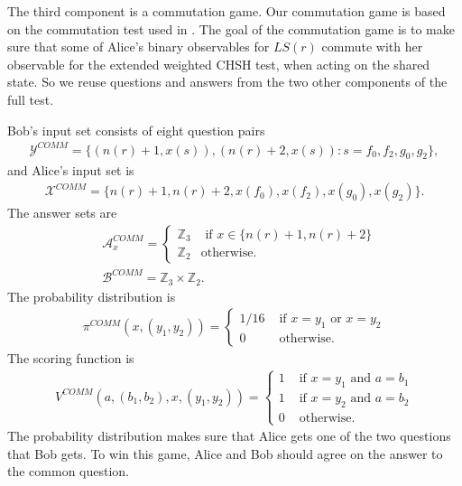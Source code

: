 \documentclass[11pt,letterpaper]{article}
\newcommand{\Z}{\mathbb{Z}}
\newcommand{\calX}{\mathcal{X}}
\newcommand{\calY}{\mathcal{Y}}
\newcommand{\calA}{\mathcal{A}}
\newcommand{\calB}{\mathcal{B}}
\newcommand{\1}{\mathbb{1}}
\newcommand{\LS}{LS}
\newcommand{\COMM}{COMM}
\newcommand{\nr}{n(r)}
\theoremstyle{definition}
\begin{document}
The third component is a commutation game.
Our commutation game is based on the commutation test used in \cite{coladan2017verifier}.
The goal of the commutation game is to make sure that some
of Alice's binary observables for $\LS(r)$ 
commute with her observable for the extended weighted CHSH test,
when acting on the shared state.
So we reuse questions and answers from the two other components
of the full test.

Bob's input set consists of eight question pairs
\begin{align*}
    \calY^{\COMM} = \{(\nr+1, x(s)), (\nr+2, x(s)): s = f_0, f_2, g_0, g_2 \},
\end{align*}
and
Alice's input set is 
\begin{align*}
    \calX^{\COMM} = \{\nr+1, \nr+2, x(f_0), x(f_2), x(g_0), x(g_2)\}.
\end{align*}
The answer sets are 
\begin{align*}
    &\calA^{\COMM}_x = 
    \begin{cases}
    \Z_3 &\text{ if } x \in \{\nr+1, \nr+2\} \\
    \Z_2 &\text{otherwise.}
    \end{cases}
    \\
    &\calB^{\COMM} = \Z_3 \times \Z_2.
\end{align*}
The probability distribution is
\begin{align*}
    \pi^{\COMM}(x,(y_1,y_2)) =
    \begin{cases}
        1/16 &\text{ if } x = y_1 \text{ or } x = y_2 \\
        0   &\text{ otherwise}.
    \end{cases}
\end{align*}
The scoring function is
\begin{align*}
    V^{\COMM}(a, (b_1,b_2), x, (y_1,y_2)) = 
    \begin{cases}
    1 &\text{ if } x = y_1 \text{ and } a = b_1 \\
    1 &\text{ if } x = y_2 \text{ and } a = b_2 \\
    0 &\text{ otherwise}.
    \end{cases}
\end{align*}
The probability distribution makes sure that Alice gets one of
the two questions that Bob gets.
To win this game, Alice and Bob should agree on the answer to the
common question.
\end{document}
